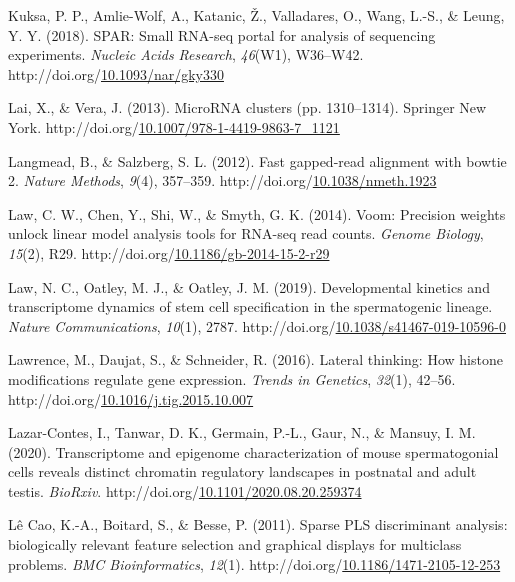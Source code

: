 \documentclass[12pt,twoside]{reedthesis}
\newlength{\cslhangindent}
\newenvironment{CSLReferences}[2] %
 {%
  \setlength{\parindent}{0pt}
  \ifodd #1 \everypar{\setlength{\hangindent}{\cslhangindent}}\ignorespaces\fi
  \ifnum #2 > 0
  \setlength{\parskip}{#2\baselineskip}
  \fi
 }%
 {}
\begin{document}
\begin{CSLReferences}{1}{0}
\leavevmode{}%
Kuksa, P. P., Amlie-Wolf, A., Katanic, Ž., Valladares, O., Wang, L.-S., \& Leung, Y. Y. (2018). SPAR: Small RNA-seq portal for analysis of sequencing experiments. \emph{Nucleic Acids Research}, \emph{46}(W1), W36--W42. http://doi.org/\href{https://doi.org/10.1093/nar/gky330}{10.1093/nar/gky330}

\leavevmode{}%
Lai, X., \& Vera, J. (2013). MicroRNA clusters (pp. 1310--1314). Springer New York. http://doi.org/\href{https://doi.org/10.1007/978-1-4419-9863-7_1121}{10.1007/978-1-4419-9863-7\_1121}

\leavevmode{}%
Langmead, B., \& Salzberg, S. L. (2012). Fast gapped-read alignment with bowtie 2. \emph{Nature Methods}, \emph{9}(4), 357--359. http://doi.org/\href{https://doi.org/10.1038/nmeth.1923}{10.1038/nmeth.1923}

\leavevmode{}%
Law, C. W., Chen, Y., Shi, W., \& Smyth, G. K. (2014). Voom: Precision weights unlock linear model analysis tools for RNA-seq read counts. \emph{Genome Biology}, \emph{15}(2), R29. http://doi.org/\href{https://doi.org/10.1186/gb-2014-15-2-r29}{10.1186/gb-2014-15-2-r29}

\leavevmode{}%
Law, N. C., Oatley, M. J., \& Oatley, J. M. (2019). Developmental kinetics and transcriptome dynamics of stem cell specification in the spermatogenic lineage. \emph{Nature Communications}, \emph{10}(1), 2787. http://doi.org/\href{https://doi.org/10.1038/s41467-019-10596-0}{10.1038/s41467-019-10596-0}

\leavevmode{}%
Lawrence, M., Daujat, S., \& Schneider, R. (2016). Lateral thinking: How histone modifications regulate gene expression. \emph{Trends in Genetics}, \emph{32}(1), 42--56. http://doi.org/\href{https://doi.org/10.1016/j.tig.2015.10.007}{10.1016/j.tig.2015.10.007}

\leavevmode{}%
Lazar-Contes, I., Tanwar, D. K., Germain, P.-L., Gaur, N., \& Mansuy, I. M. (2020). Transcriptome and epigenome characterization of mouse spermatogonial cells reveals distinct chromatin regulatory landscapes in postnatal and adult testis. \emph{BioRxiv}. http://doi.org/\href{https://doi.org/10.1101/2020.08.20.259374}{10.1101/2020.08.20.259374}

\leavevmode{}%
Lê Cao, K.-A., Boitard, S., \& Besse, P. (2011). Sparse PLS discriminant analysis: biologically relevant feature selection and graphical displays for multiclass problems. \emph{BMC Bioinformatics}, \emph{12}(1). http://doi.org/\href{https://doi.org/10.1186/1471-2105-12-253}{10.1186/1471-2105-12-253}


\end{CSLReferences}
\end{document}
